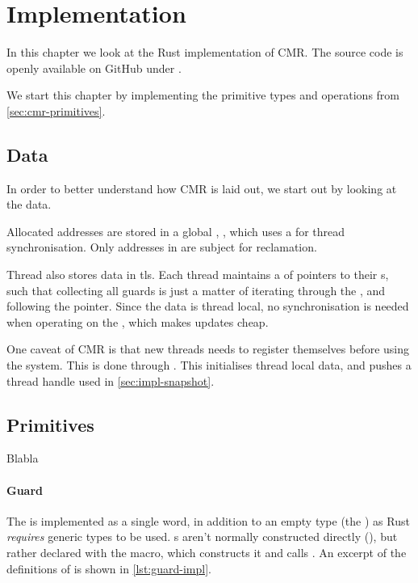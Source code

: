 \chapter{Implementation\label{ch:implementation}}

In this chapter we look at the Rust implementation of CMR\@. The source code is openly available
on GitHub under \cite{cmr-github}.

We start this chapter by implementing the primitive types and operations from
\cref{sec:cmr-primitives}.




\section{Data\label{sec:impl-data}}

In order to better understand how CMR is laid out, we start out by looking at the data.

Allocated addresses are stored in a global , , which uses a 
for thread synchronisation. Only addresses in  are subject for reclamation.


Thread also stores data in \gls{tls}. Each thread maintains a  of pointers to their
s, such that collecting all guards is just a matter of iterating through the
, and following the pointer. Since the data is thread local, no synchronisation is needed
when operating on the , which makes updates cheap.

One caveat of CMR is that new threads needs to register themselves before using the system. This is
done through . This initialises thread local data, and pushes a
thread handle used in \cref{sec:impl-snapshot}.



\section{Primitives}

Blabla

\subsubsection{Guard}

The  is implemented as a single word, in addition to an empty type (the
) as Rust \emph{requires} generic types to be used. s aren't normally
constructed directly (), but rather declared with the
 macro, which constructs it and calls .
An excerpt of the definitions of  is shown in \cref{lst:guard-impl}.

